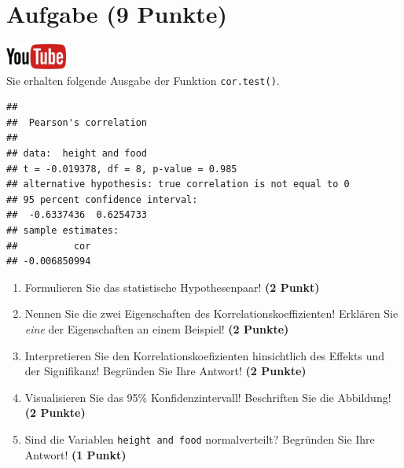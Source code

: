 \documentclass[a4paper, 9pt]{scrartcl}\usepackage[]{graphicx}\usepackage[]{xcolor}
\makeatletter
\newenvironment{kframe}{%
 \def\at@end@of@kframe{}%
 \ifinner\ifhmode%
  \def\at@end@of@kframe{\end{minipage}}%
  \begin{minipage}{\columnwidth}%
 \fi\fi%
 \def\FrameCommand##1{\hskip\@totalleftmargin \hskip-\fboxsep
 \colorbox{shadecolor}{##1}\hskip-\fboxsep
     \hskip-\linewidth \hskip-\@totalleftmargin \hskip\columnwidth}%
 \MakeFramed {\advance\hsize-\width
   \@totalleftmargin\z@ \linewidth\hsize
   \@setminipage}}%
 {\par\unskip\endMakeFramed%
 \at@end@of@kframe}
\newenvironment{knitrout}{}{} %
\makeatother
\begin{document}
 
\clearpage

\section{Aufgabe \hfill (9 Punkte)}

\hfill\href{https://youtu.be/C9skfFRTHhI}{\includegraphics[width =
   2cm]{img/youtube}}\\[1Ex]

Sie erhalten folgende \Rlogo Ausgabe der Funktion \texttt{cor.test()}.

\begin{knitrout}
\color{fgcolor}\begin{kframe}
\begin{verbatim}
## 
## 	Pearson's correlation
## 
## data:  height and food
## t = -0.019378, df = 8, p-value = 0.985
## alternative hypothesis: true correlation is not equal to 0
## 95 percent confidence interval:
##  -0.6337436  0.6254733
## sample estimates:
##          cor 
## -0.006850994
\end{verbatim}
\end{kframe}
\end{knitrout}


\begin{enumerate}
  \item Formulieren Sie das statistische Hypothesenpaar! \textbf{(2
Punkt)}
\item Nennen Sie die zwei Eigenschaften des Korrelationskoeffizienten!
  Erkl{\"a}ren Sie \textit{eine} der Eigenschaften an einem Beispiel! \textbf{(2
    Punkte)}
\item Interpretieren Sie den Korrelationskoefizienten hinsichtlich des
  Effekts und der Signifikanz! Begr{\"u}nden Sie
  Ihre Antwort! \textbf{(2 Punkte)}
\item Visualisieren Sie das 95\% Konfidenzintervall! Beschriften Sie die Abbildung! \textbf{(2 Punkte)} 
\item Sind die Variablen \texttt{height and food} normalverteilt?
  Begr{\"u}nden Sie Ihre Antwort! \textbf{(1 Punkt)}
\end{enumerate} 
\clearpage
\end{document}
